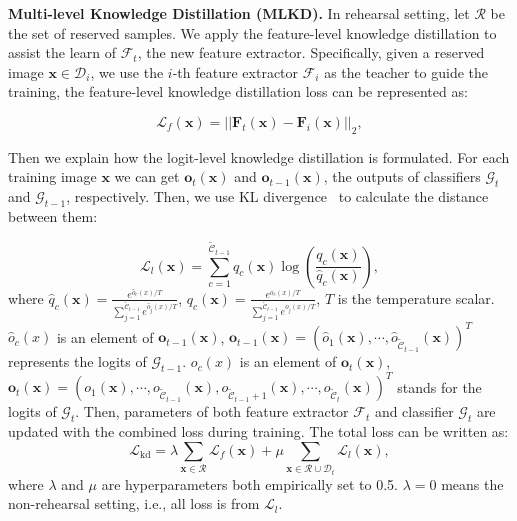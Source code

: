 \documentclass[letterpaper]{article} %
\begin{document}
\noindent\textbf{Multi-level Knowledge Distillation (MLKD).}
In rehearsal setting, let $\mathcal{R}$ be the set of reserved samples. We apply the feature-level knowledge distillation to assist the learn of $\mathcal{F}_{t}$, the new feature extractor. Specifically, given a reserved image $\boldsymbol{x}\in \mathcal{D}_{i}$, we use the $i$-th feature extractor $\mathcal{F}_{i}$ as the teacher to guide the training, the feature-level knowledge distillation loss can be represented as:

\begin{equation}
\mathcal{L}_{f}(\boldsymbol{x})=||\boldsymbol{F}_{t}(\boldsymbol{x})- \boldsymbol{F}_{i}(\boldsymbol{x})||_2, 
\label{e6}
\end{equation}

Then we explain how the logit-level knowledge distillation is formulated. For each training image  $\boldsymbol{x}$ we can get $\boldsymbol{o}_{t}(\boldsymbol{x})$ and $\boldsymbol{o}_{t-1}(\boldsymbol{x})$, the outputs of classifiers $\mathcal{G}_{t}$ and $\mathcal{G}_{t-1}$, respectively. Then, we use KL divergence~\cite{r23} to calculate the distance between them:

\begin{equation}
\mathcal{L}_{l}(\boldsymbol{x})=\sum_{c=1}^{\tilde{\mathcal{C}}_{t-1}}{q}_{c}(\boldsymbol{x}) \log \left(\frac{{q}_{c}(\boldsymbol{x})}{\hat{q}_{c}(\boldsymbol{x})}\right),
\label{e7}
\end{equation}
where $\hat{q}_{c}(\boldsymbol{x})=\frac{e^{\hat{o}_{c}(x) / T}}{\sum_{j=1}^{\tilde{\mathcal{C}}_{t-1}} e^{\hat{o}_{j}(x) / T}}$, $ q_{c}(\boldsymbol{x})=\frac{e^{o_{c}(x) / T}}{\sum_{j=1}^{\tilde{\mathcal{C}}_{t-1}} e^{o_{j}(x) / T}}$, $T$ is the temperature scalar. $\hat{o}_{c}(x)$ is an element of $\boldsymbol{o}_{t-1}(\boldsymbol{x})$, $\boldsymbol{o}_{t-1}(\boldsymbol{x})=(\hat{o}_{1}(\boldsymbol{x}), \cdots, \hat{o}_{\tilde{\mathcal{C}}_{t-1}}(\boldsymbol{x}))^{T}$ represents the logits of $\mathcal{G}_{t-1}$. $o_{c}(x)$ is an element of $\boldsymbol{o}_{t}(\boldsymbol{x})$, $\boldsymbol{o}_{t}(\boldsymbol{x}) = (o_{1}(\boldsymbol{x}), \cdots, o_{\tilde{\mathcal{C}}_{t-1}}(\boldsymbol{x}), o_{\tilde{\mathcal{C}}_{t-1}+1}(\boldsymbol{x}), \cdots, o_{\tilde{\mathcal{C}}_{t}}(\boldsymbol{x}))^{T}$ stands for the logits of $\mathcal{G}_{t}$. Then, parameters of both feature extractor $\mathcal{F}_{t}$ and classifier $\mathcal{G}_{t}$ are updated with the combined loss during training. The total loss can be written as:
\begin{equation}
\mathcal{L}_{\mathrm{kd}}= \lambda \sum_{\boldsymbol{x}\in \mathcal{R}} \mathcal{L}_{f}(\boldsymbol{x}) + \mu  \sum_{\boldsymbol{x}\in \mathcal{R}\cup\mathcal{D}_{t}} \mathcal{L}_{l}(\boldsymbol{x}),
\label{e88}
\end{equation}
where $\lambda$ and $\mu$ are hyperparameters both empirically set to 0.5. $\lambda=0$ means the non-rehearsal setting, i.e., all loss is from $\mathcal{L}_{l}$.
\end{document}
